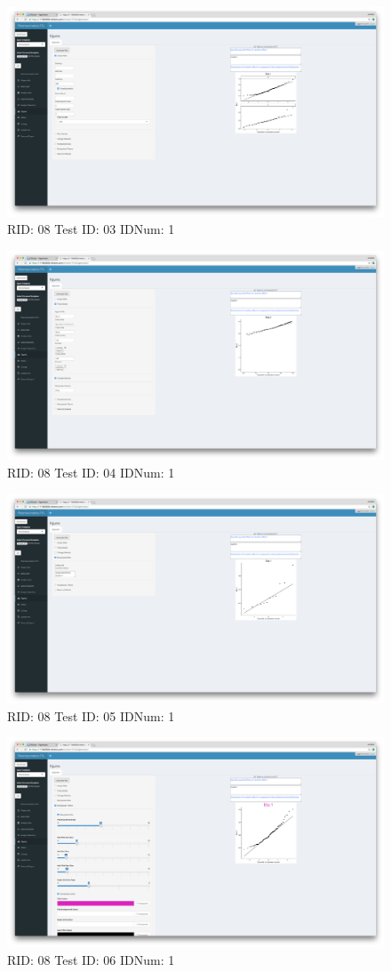 \begin{figure}[H]
\includegraphics[width=.8\textwidth]{screencaps/08-03-1.png}
\caption{RID: 08 Test ID: 03 IDNum: 1}
\end{figure}
\begin{figure}[H]
\includegraphics[width=.8\textwidth]{screencaps/08-04-1.png}
\caption{RID: 08 Test ID: 04 IDNum: 1}
\end{figure}
\begin{figure}[H]
\includegraphics[width=.8\textwidth]{screencaps/08-05-1.png}
\caption{RID: 08 Test ID: 05 IDNum: 1}
\end{figure}
\begin{figure}[H]
\includegraphics[width=.8\textwidth]{screencaps/08-06-1.png}
\caption{RID: 08 Test ID: 06 IDNum: 1}
\end{figure}
